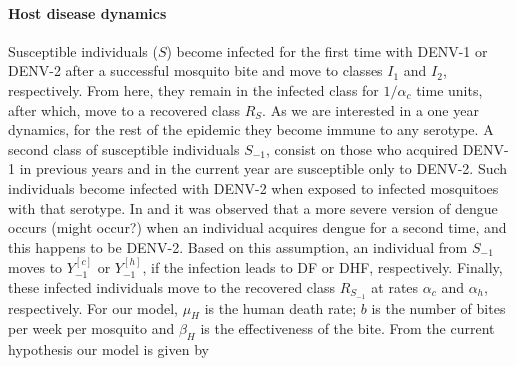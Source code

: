\paragraph{Host disease dynamics}
 Susceptible individuals ($S$) become infected for the first time with DENV-1 or DENV-2 after 
 a successful mosquito bite and move to classes $I_1$ and $I_2$, respectively. From here, they remain in the infected class for $1/\alpha_c$ time units, after which, move to a recovered class $R_S$.  As we are interested in a one year dynamics, for the rest of the epidemic they become immune to any serotype. A second class of susceptible individuals $S_{-1}$, consist on those who acquired DENV-1 in previous years and in the current year are susceptible only to DENV-2. Such individuals become infected with DENV-2 when exposed to infected mosquitoes with that serotype. In \cite{OhAinle2011} and \cite{Sangkawibha1984} it was observed that a more severe version of dengue occurs (might occur?) when an individual acquires dengue for a second time, and this happens to be DENV-2. Based on this assumption, an individual from $S_{-1}$ moves to $Y_{-1}^{[c]}$ or $Y_{-1}^{[h]}$, if the infection leads to DF or DHF, respectively. Finally, these infected individuals move to the recovered class $R_{S_{-1}}$ at rates $\alpha_c$ and $\alpha_h$, respectively. For our model, $\mu_H$ is the human death rate; $b$ is the number of bites per week per mosquito and $\beta_H$ is the effectiveness of the bite. From the current hypothesis our model is given by    


